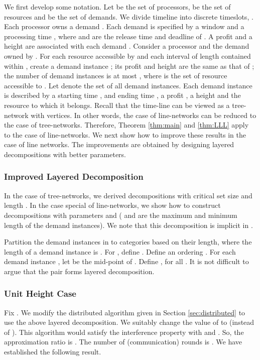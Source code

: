 \documentclass[11pt]{article}
\begin{document}
We first develop some notation. Let  be the set of  processors,  be the set of  resources
and  be the set of  demands.
We divide timeline into  discrete timeslots, . Each processor  owns a demand .
Each demand  is specified by a window  and a processing time ,
where  and  are the release time and deadline of .
A profit  and a height  are associated with each demand . 
Consider a processor  and the demand  owned by .
For each resource  accessible by  and each interval of length  contained within ,
create a demand instance ; its profit and height are the same as that of ;
the number of demand instances is at most , where 
is the set of resource accessible to . Let  denote the set of all demand instances.
Each demand instance  is described by a starting time , and ending time ,
a profit , a height  and the resource to which it belongs.
Recall that the time-line can be viewed as a tree-network with  vertices.
In other words, the case of line-networks can be reduced to the case of tree-networks.
Therefore, Theorem \ref{thm:main} and \ref{thm:LLL} apply to the case of line-networks.
We next show how to improve these results in the case of line networks.
The improvements are obtained by designing layered decompositions with better parameters.

\subsubsection*{Improved Layered Decomposition}
In the case of tree-networks, we derived decompositions with critical set size 
and length . In the case special of line-networks, we show how to construct
decompositions with parameters  and  ( and 
are the maximum and minimum length of the demand instances).
We note that this decomposition is implicit in \cite{Pancj}.

Partition the demand instances in to  categories based
on their length, where the length of a demand instance is .
For , define .
Define an ordering .
For each demand instance , let  be the mid-point of .
Define , for all .
It is not difficult to argue that the pair  forms layered decomposition.

\subsubsection*{Unit Height Case}
Fix . We modify the distributed algorithm given in Section \ref{sec:distributed}
to use the above layered decomposition. We suitably change the value of  to 
 (instead of ). This algorithm would satisfy the interference property with 
and . So, the approximation ratio is .
The number of (communication) 
rounds is .
We have established the following result.
\end{document}
